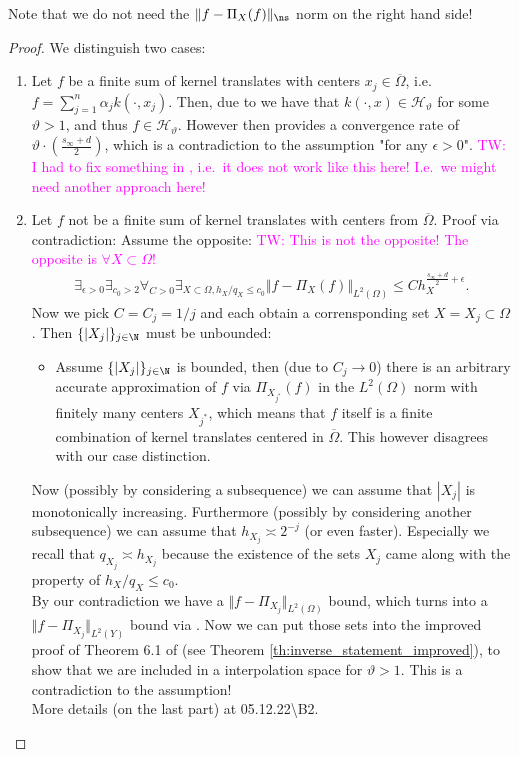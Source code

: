 \documentclass[a4paper, 10pt]{article}
\newcommand{\Ht}{\mathcal{H}_{\vartheta}}
\newcommand{\tw}[1]{\textcolor{magenta}{TW: #1}}
\begin{document}
\noindent Note that we do not need the $\Vert f - \Pi_X(f) \Vert_{\ns}$ norm on the right hand side!

\begin{proof}
We distinguish two cases:
\begin{enumerate}
\item Let $f$ be a finite sum of kernel translates with centers $x_j \in \overline{\Omega}$, 
i.e.\ $f = \sum_{j=1}^n \alpha_j k(\cdot, x_j)$. 
Then, due to  we have that $k(\cdot, x) \in \Ht$ for some $\vartheta > 1$, and thus $f \in \Ht$.
However then  provides a convergence rate of $\vartheta \cdot \left( \frac{s_\infty + d}{2} \right)$, which is a contradiction to the assumption "for any $\epsilon > 0$".
\tw{I had to fix something in \Cref{subsec:kernel_transl_smoother}, i.e.\ it does not work like this here! 
I.e.\ we might need another approach here!}
\item Let $f$ not be a finite sum of kernel translates with centers from $\overline{\Omega}$.
Proof via contradiction: Assume the opposite:
\tw{This is not the opposite! The opposite is $\forall X \subset \Omega$!}
\begin{align*}
\exists_{\epsilon > 0} \exists_{c_0 > 2} \forall_{C>0} \exists_{X \subset \Omega, h_X/q_X \leq c_0} \Vert f - \Pi_X(f) \Vert_{L^2(\Omega)} \leq C h_X^{\frac{s_\infty + d}{2} + \epsilon}.
\end{align*}
Now we pick $C = C_j = 1/j$ and each obtain a corrensponding set $X = X_j \subset \Omega$.
Then $\{ |X_j| \}_{j \in \N}$ must be unbounded:
\begin{itemize}
\item Assume $\{ |X_j| \}_{j \in \N}$ is bounded, then (due to $C_j \rightarrow 0$) there is an arbitrary accurate approximation of $f$ via $\Pi_{X_{j^*}}(f)$ in the $L^2(\Omega)$ norm with finitely many centers $X_{j^*}$, which means that $f$ itself is a finite combination of kernel translates centered in $\overline{\Omega}$. 
%
This however disagrees with our case distinction.
\end{itemize}
Now (possibly by considering a subsequence) we can assume that $|X_j|$ is monotonically increasing.
Furthermore (possibly by considering another subsequence) we can assume that $h_{X_j}  \asymp 2^{-j}$ (or even faster).
Especially we recall that $q_{X_j} \asymp h_{X_j}$ because the existence of the sets $X_j$ came along with the property of $h_X / q_X \leq c_0$. \\
By our contradiction we have a $\Vert f - \Pi_{X_j} \Vert_{L^2(\Omega)}$ bound, which turns into a $\Vert f - \Pi_{X_j} \Vert_{L^2(Y)}$ bound via .
Now we can put those sets into the improved proof of Theorem 6.1 of \cite{schaback2002inverse} (see Theorem \ref{th:inverse_statement_improved}),
to show that we are included in a interpolation space for $\vartheta > 1$.
This is a contradiction to the assumption! \\
More details (on the last part) at 05.12.22\textbackslash B2.
\end{enumerate}
\end{proof}
\end{document}
